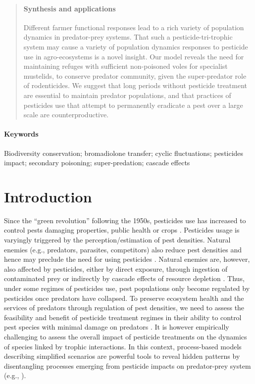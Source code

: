 \documentclass[11pt]{article}
\begin{document}
\begin{abstract}
\paragraph{Synthesis and applications} Different farmer functional responses lead to a rich variety of population dynamics in predator-prey systems. That such a pesticide-tri-trophic system may cause a variety of population dynamics responses to pesticide use in agro-ecosystems is a novel insight. Our model reveals the need for maintaining refuges with sufficient non-poisoned voles for specialist mustelids, to conserve predator community, given the super-predator role of rodenticides. We suggest that long periods without pesticide treatment are essential to maintain predator populations, and that practices of pesticides use that attempt to permanently eradicate a pest over a large scale are counterproductive. 

\end{abstract}

\paragraph{Keywords} Biodiversity conservation; bromadiolone transfer; cyclic fluctuations; pesticides impact; secondary poisoning; super-predation; cascade effects

\section{Introduction}

Since the “green revolution” following the 1950s, pesticides use has increased to control pests damaging properties, public health or crops \citep{Tilman2002}. Pesticides usage is varyingly triggered by the perception/estimation of pest densities. Natural enemies (e.g., predators, parasites, competitors) also reduce pest densities and hence may preclude the need for using pesticides \citep{Michalko2017}. Natural enemies are, however, also affected by pesticides, either by direct exposure, through ingestion of contaminated prey \citep{Berny2007} or indirectly by cascade effects of resource depletion \citep{Halstead2014}.  Thus, under some regimes of pesticides use, pest populations only become regulated by pesticides once predators have collapsed. To preserve ecosystem health and the services of predators through regulation of pest densities, we need to assess the feasibility and benefit of pesticide treatment regimes in their ability to control pest species with minimal damage on predators \citep{Halstead2014}. It is however empirically challenging to assess the overall impact of pesticide treatments on the dynamics of species linked by trophic interactions. In this context, process-based models describing simplified scenarios are powerful tools to reveal hidden patterns by disentangling processes emerging from pesticide impacts on predator-prey system (e.g., \citet{Baudrot2018}).
\end{document}
